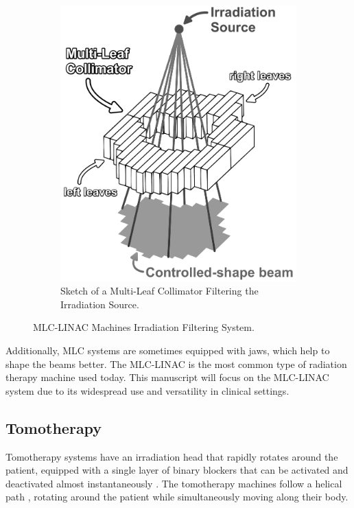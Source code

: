 \begin{figure}
\begin{subfigure}[b]{0.35\textwidth}
		\includegraphics[width=\textwidth]{MLC_sketch_bis.pdf}
		\caption{Sketch of a Multi-Leaf Collimator Filtering the Irradiation Source.}
		\label{fig:MLC_sketch_bis}
	\end{subfigure}
	\caption{MLC-LINAC Machines Irradiation Filtering System.}
	\label{fig:MLC_sketches}
\end{figure}
Additionally, MLC systems are sometimes equipped with jaws, which help to shape the beams better.
The MLC-LINAC is the most common type of radiation therapy machine used today.
This manuscript will focus on the MLC-LINAC system due to its widespread use and versatility in clinical settings.

\subsection{Tomotherapy}
Tomotherapy systems have an irradiation head that rapidly rotates around the patient, equipped with a single layer of binary blockers that can be activated and deactivated almost instantaneously \cite{Mackie1999}.
The tomotherapy machines follow a helical path \cite{Jeraj2004}, rotating around the patient while simultaneously moving along their body.

